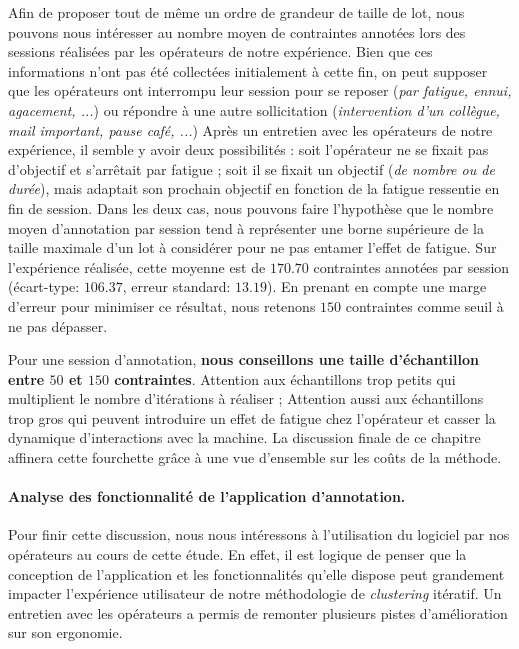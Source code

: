 			Afin de proposer tout de même un ordre de grandeur de taille de lot, nous pouvons nous intéresser au nombre moyen de contraintes annotées lors des sessions réalisées par les opérateurs de notre expérience.
			Bien que ces informations n'ont pas été collectées initialement à cette fin, on peut supposer que les opérateurs ont interrompu leur session pour se reposer (\textit{par fatigue, ennui, agacement, ...}) ou répondre à une autre sollicitation (\textit{intervention d'un collègue, mail important, pause café, ...})
			Après un entretien avec les opérateurs de notre expérience, il semble y avoir deux possibilités : soit l'opérateur ne se fixait pas d'objectif et s'arrêtait par fatigue ; soit il se fixait un objectif (\textit{de nombre ou de durée}), mais adaptait son prochain objectif en fonction de la fatigue ressentie en fin de session.
			Dans les deux cas, nous pouvons faire l'hypothèse que le nombre moyen d'annotation par session tend à représenter une borne supérieure de la taille maximale d'un lot à considérer pour ne pas entamer l'effet de fatigue.
			Sur l'expérience réalisée, cette moyenne est de $170.70$ contraintes annotées par session (écart-type: $106.37$, erreur standard: $13.19$).
			En prenant en compte une marge d'erreur pour minimiser ce résultat, nous retenons $150$ contraintes comme seuil à ne pas dépasser.
			
			\begin{leftBarSummary}
				Pour une session d'annotation, \textbf{nous conseillons une taille d'échantillon entre $50$ et $150$ contraintes}.
				Attention aux échantillons trop petits qui multiplient le nombre d'itérations à réaliser ;
				Attention aussi aux échantillons trop gros qui peuvent introduire un effet de fatigue chez l'opérateur et casser la dynamique d'interactions avec la machine.
				La discussion finale de ce chapitre affinera cette fourchette grâce à une vue d'ensemble sur les coûts de la méthode.
			\end{leftBarSummary}
			

		\paragraph{Analyse des fonctionnalité de l'application d'annotation.}
		
			Pour finir cette discussion, nous nous intéressons à l'utilisation du logiciel par nos opérateurs au cours de cette étude.
			En effet, il est logique de penser que la conception de l'application et les fonctionnalités qu'elle dispose peut grandement impacter l'expérience utilisateur de notre méthodologie de \textit{clustering} itératif.
			Un entretien avec les opérateurs a permis de remonter plusieurs pistes d'amélioration sur son ergonomie.
			
